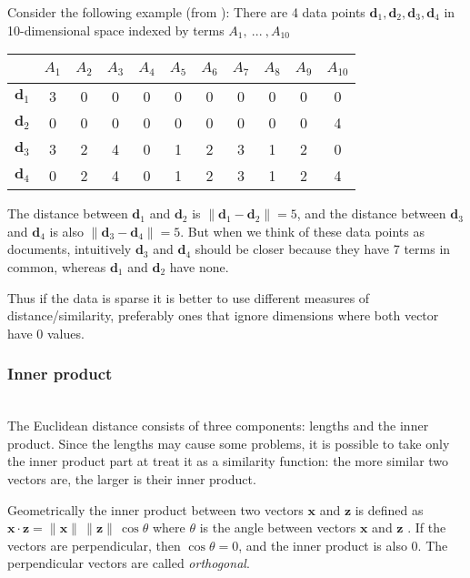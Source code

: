 Consider the following example (from \cite{ertoz2003finding}):
There are 4 data points $\mathbf d_1, \mathbf d_2, \mathbf d_3, \mathbf d_4$
in 10-dimensional space indexed by terms $A_1, \ ... \ , A_{10}$

\begin{center}
\begin{tabular}{|c|cccccccccc|}
  \hline
~ &  $A_1$ &   $A_2$ &   $A_3$ &  $A_4$ &  $A_5$ &  $A_6$ &  $A_7$ &  $A_8$ &  $A_9$ &  $A_{10}$ \\
  \hline
$\mathbf d_1$ &  3 &  0 &  0 &  0 &  0 &  0 &  0 &  0 &  0 &  0 \\
$\mathbf d_2$ &  0 &  0 &  0 &  0 &  0 &  0 &  0 &  0 &  0 &  4 \\
  \hline
$\mathbf d_3$ &  3 &  2 &  4 &  0 &  1 &  2 &  3 &  1 &  2 &  0 \\
$\mathbf d_4$ &  0 &  2 &  4 &  0 &  1 &  2 &  3 &  1 &  2 &  4 \\
  \hline
\end{tabular}
\end{center}

The distance between $\mathbf d_1$ and $\mathbf d_2$ is
$\| \mathbf d_1 - \mathbf d_2\| = 5$, and the distance between
$\mathbf d_3$ and $\mathbf d_4$ is also $\| \mathbf d_3 - \mathbf d_4\| = 5$.
But when we think of these data points as documents, intuitively
$\mathbf d_3$ and $\mathbf d_4$ should be closer because they
have 7 terms in common, whereas $\mathbf d_1$ and $\mathbf d_2$ have none.

Thus if the data is sparse it is better to use different measures
of distance/similarity, preferably ones that ignore dimensions
where both vector have 0 values.


\subsubsection{Inner product} \ \\

The Euclidean distance consists of three components: lengths and the inner product.
Since the lengths may cause some problems, it is possible to take only
the inner product part at treat it as a similarity function:
the more similar two vectors are, the larger is their inner product.

Geometrically the inner product between two vectors $\mathbf x$ and $\mathbf z$
is defined as
$\mathbf x \cdot \mathbf z = \|\mathbf x \| \, \| \mathbf z \| \, \cos \theta$
where $\theta$ is the angle between vectors $\mathbf x$ and $\mathbf z$ \cite{huges2013calculus}.
If the vectors are perpendicular, then $\cos \theta = 0$,
and the inner product is also $0$. The perpendicular vectors are called \emph{orthogonal}.

